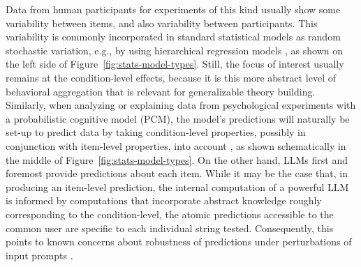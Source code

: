 \documentclass[fleqn]{article}
\begin{document}
Data from human participants for experiments of this kind usually show some variability between items, and also variability between participants.
This variability is commonly incorporated in standard statistical models as random stochastic variation, e.g., by using hierarchical regression models \citep{Jaeger2008:Categorical-dat,barr2013,SorensenHohensteinb2016:Bayesian-linear}, as shown on the left side of Figure~\ref{fig:stats-model-types}.
Still, the focus of interest usually remains at the condition-level effects, because it is this more abstract level of behavioral aggregation that is relevant for generalizable theory building.
Similarly, when analyzing or explaining data from psychological experiments with a probabilistic cognitive model (PCM), the model's predictions will naturally be set-up to predict data by taking condition-level properties, possibly in conjunction with item-level properties, into account \citep[e.g.,][]{NilsonRieskamp2011:Hierarchical-Ba,Lee2011:How-Cognitive-M,ScheibehenneRieskamp2013:Testing-the-Ada}, as shown schematically in the middle of Figure~\ref{fig:stats-model-types}.
On the other hand, LLMs first and foremost provide predictions about each item.
While it may be the case that, in producing an item-level prediction, the internal computation of a powerful LLM is informed by computations that incorporate abstract knowledge roughly corresponding to the condition-level, the atomic predictions accessible to the common user are specific to each individual string tested.
Consequently, this points to known concerns about robustness of predictions under perturbations of input prompts \citep[e.g.][]{ReynoldsMcDonell2021:Prompt-Programm,WebsonPavlick2022:Do-Prompt-Based,SalinasMorstatter2024:The-Butterfly-E,TsvilodubWang2024:Predictions-fro}.
\end{document}
